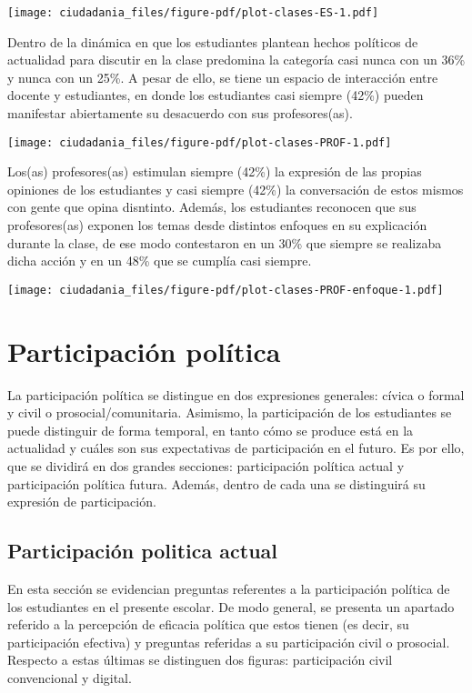 \documentclass[
  letterpaper,
  DIV=11,
  numbers=noendperiod]{scrreprt}
\begin{document}
\texttt{[image: ciudadania\_files/figure-pdf/plot-clases-ES-1.pdf]}

Dentro de la dinámica en que los estudiantes plantean hechos políticos
de actualidad para discutir en la clase predomina la categoría casi
nunca con un 36\% y nunca con un 25\%. A pesar de ello, se tiene un
espacio de interacción entre docente y estudiantes, en donde los
estudiantes casi siempre (42\%) pueden manifestar abiertamente su
desacuerdo con sus profesores(as).

\texttt{[image: ciudadania\_files/figure-pdf/plot-clases-PROF-1.pdf]}

Los(as) profesores(as) estimulan siempre (42\%) la expresión de las
propias opiniones de los estudiantes y casi siempre (42\%) la
conversación de estos mismos con gente que opina disntinto. Además, los
estudiantes reconocen que sus profesores(as) exponen los temas desde
distintos enfoques en su explicación durante la clase, de ese modo
contestaron en un 30\% que siempre se realizaba dicha acción y en un
48\% que se cumplía casi siempre.

\texttt{[image: ciudadania\_files/figure-pdf/plot-clases-PROF-enfoque-1.pdf]}

\section{Participación política}\label{participaciuxf3n-poluxedtica}

La participación política se distingue en dos expresiones generales:
cívica o formal y civil o prosocial/comunitaria. Asimismo, la
participación de los estudiantes se puede distinguir de forma temporal,
en tanto cómo se produce está en la actualidad y cuáles son sus
expectativas de participación en el futuro. Es por ello, que se dividirá
en dos grandes secciones: participación política actual y participación
política futura. Además, dentro de cada una se distinguirá su expresión
de participación.

\subsection{Participación politica
actual}\label{participaciuxf3n-politica-actual}

En esta sección se evidencian preguntas referentes a la participación
política de los estudiantes en el presente escolar. De modo general, se
presenta un apartado referido a la percepción de eficacia política que
estos tienen (es decir, su participación efectiva) y preguntas referidas
a su participación civil o prosocial. Respecto a estas últimas se
distinguen dos figuras: participación civil convencional y digital.
\end{document}
